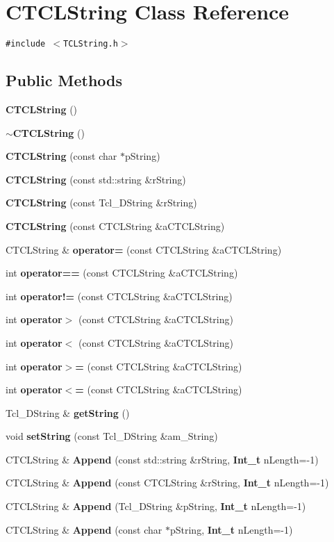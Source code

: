 \section{CTCLString  Class Reference}
\label{classCTCLString}
{\tt \#include $<$TCLString.h$>$}

\subsection*{Public Methods}
\begin{CompactItemize}
\item 
{\bf CTCLString} ()
\item 
{\bf $\sim$CTCLString} ()
\item 
{\bf CTCLString} (const char $\ast$p\-String)
\item 
{\bf CTCLString} (const std::string \&r\-String)
\item 
{\bf CTCLString} (const Tcl\_\-DString \&r\-String)
\item 
{\bf CTCLString} (const CTCLString \&a\-CTCLString)
\item 
CTCLString \& {\bf operator=} (const CTCLString \&a\-CTCLString)
\item 
int {\bf operator==} (const CTCLString \&a\-CTCLString)
\item 
int {\bf operator!=} (const CTCLString \&a\-CTCLString)
\item 
int {\bf operator$>$} (const CTCLString \&a\-CTCLString)
\item 
int {\bf operator$<$} (const CTCLString \&a\-CTCLString)
\item 
int {\bf operator$>$=} (const CTCLString \&a\-CTCLString)
\item 
int {\bf operator$<$=} (const CTCLString \&a\-CTCLString)
\item 
Tcl\_\-DString \& {\bf get\-String} ()
\item 
void {\bf set\-String} (const Tcl\_\-DString \&am\_\-String)
\item 
CTCLString \& {\bf Append} (const std::string \&r\-String, {\bf Int\_\-t} n\-Length=-1)
\item 
CTCLString \& {\bf Append} (const CTCLString \&r\-String, {\bf Int\_\-t} n\-Length=-1)
\item 
CTCLString \& {\bf Append} (Tcl\_\-DString \&p\-String, {\bf Int\_\-t} n\-Length=-1)
\item 
CTCLString \& {\bf Append} (const char $\ast$p\-String, {\bf Int\_\-t} n\-Length=-1)
\item 

\end{CompactItemize}
